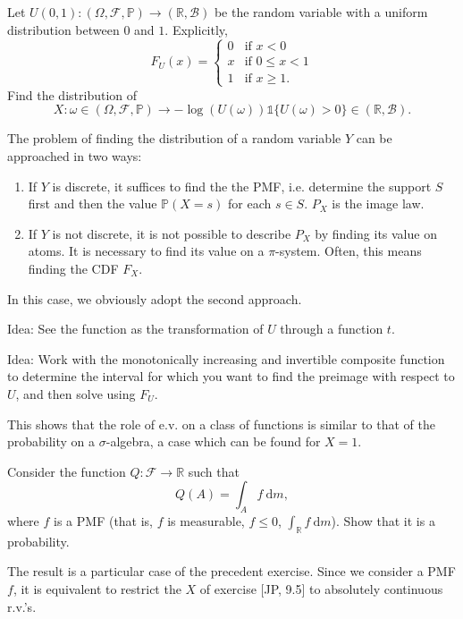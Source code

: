 \begin{my_ex}
	Let $U(0,1):(\Omega,\mathcal{F},\mathbb{P}) \to (\mathbb{R},\mathcal{B})$ be the random variable with a uniform distribution between $0$ and $1$.
	Explicitly,
	\[
		F_U(x)=
		\begin{cases}
			0 & \text{if } x < 0 \\
			x & \text{if } 0 \leq x < 1 \\
			1 & \text{if } x \geq 1.
		\end{cases}	
	\]
	Find the distribution of
	\[
		X : 
		\omega 
		\in (\Omega,\mathcal{F},\mathbb{P}) 
		\to  
		- \log ( U( \omega ) ) \mathbb{1} \{U( \omega ) > 0\} 
		\in (\mathbb{R},\mathcal{B}).	
	\]
\end{my_ex}
\begin{my_remark}
	The problem of finding the distribution of a random variable $Y$ can be approached in two ways:
	\begin{enumerate}
		\item If $Y$ is discrete, it suffices to find the the PMF, i.e. determine the support $S$ first and then the value $\mathbb{P} (X = s)$ for each $s \in S$. $P_X$ is the image law.
		\item If $Y$ is not discrete, it is not possible to describe $P_X$ by finding its value on atoms. It is necessary to find its value on a $\pi$-system. Often, this means finding the CDF $F_X$.
	\end{enumerate}
	In this case, we obviously adopt the second approach.
	
	Idea: See the function as the transformation of $U$ through a function $t$.
	
	Idea: Work with the monotonically increasing and invertible composite function to determine the interval for which you want to find the preimage with respect to $U$, and then solve using $F_U$.
\end{my_remark}

\begin{my_ex}[JP, 9.5]
\end{my_ex}
\begin{my_remark}
	This shows that the role of e.v. on a class of functions is similar to that of the probability on a $\sigma$-algebra, a case which can be found for $X=1$.
\end{my_remark}

\begin{my_ex}
	Consider the function $Q:\mathcal{F}\to\mathbb{R}$ such that
	\[
		Q(A) = \int_A f \:\mathrm{d} m,
	\]
	where $f$ is a PMF (that is, $f$ is measurable, $f \leq 0$, $\int_\mathbb{R} f \:\mathrm{d}m$).	Show that it is a probability.
\end{my_ex}
\begin{my_remark}
	The result is a particular case of the precedent exercise. Since we consider a PMF $f$, it is equivalent to restrict the $X$ of exercise [JP, 9.5] to absolutely continuous r.v.'s.
\end{my_remark}

